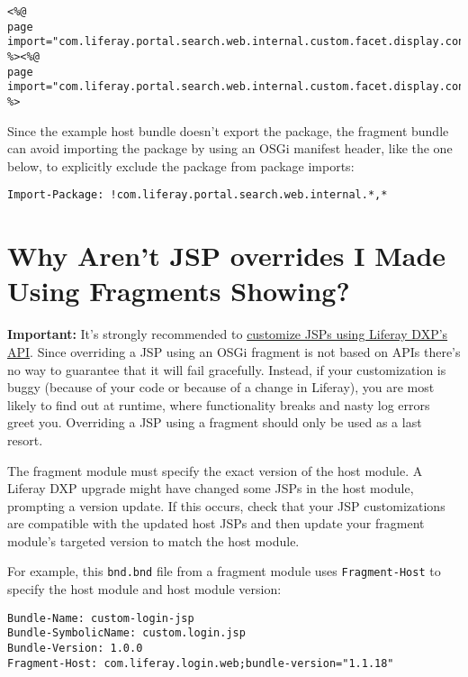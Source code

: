 \begin{verbatim}
<%@
page import="com.liferay.portal.search.web.internal.custom.facet.display.context.CustomFacetDisplayContext" %><%@
page import="com.liferay.portal.search.web.internal.custom.facet.display.context.CustomFacetTermDisplayContext" %>
\end{verbatim}

Since the example host bundle doesn't export the package, the fragment
bundle can avoid importing the package by using an OSGi manifest header,
like the one below, to explicitly exclude the package from package
imports:

\begin{verbatim}
Import-Package: !com.liferay.portal.search.web.internal.*,*
\end{verbatim}

\chapter{Why Aren't JSP overrides I Made Using Fragments
Showing?}\label{why-arent-jsp-overrides-i-made-using-fragments-showing}

\noindent\hrulefill

\textbf{Important:} It's strongly recommended to
\href{/docs/7-2/customization/-/knowledge_base/c/customizing-jsps}{customize
JSPs using Liferay DXP's API}. Since overriding a JSP using an OSGi
fragment is not based on APIs there's no way to guarantee that it will
fail gracefully. Instead, if your customization is buggy (because of
your code or because of a change in Liferay), you are most likely to
find out at runtime, where functionality breaks and nasty log errors
greet you. Overriding a JSP using a fragment should only be used as a
last resort.

\noindent\hrulefill

The fragment module must specify the exact version of the host module. A
Liferay DXP upgrade might have changed some JSPs in the host module,
prompting a version update. If this occurs, check that your JSP
customizations are compatible with the updated host JSPs and then update
your fragment module's targeted version to match the host module.

For example, this \texttt{bnd.bnd} file from a fragment module uses
\texttt{Fragment-Host} to specify the host module and host module
version:

\begin{verbatim}
Bundle-Name: custom-login-jsp
Bundle-SymbolicName: custom.login.jsp
Bundle-Version: 1.0.0
Fragment-Host: com.liferay.login.web;bundle-version="1.1.18"
\end{verbatim}

